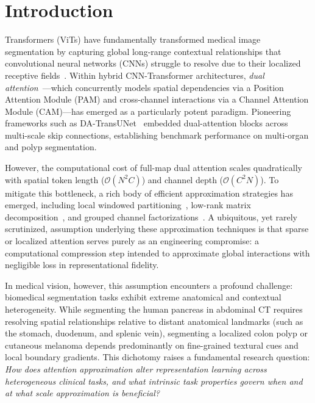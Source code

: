 \section{Introduction}
\label{sec:introduction}

 Transformers (ViTs) have fundamentally transformed medical image segmentation by capturing global long-range contextual relationships that convolutional neural networks (CNNs) struggle to resolve due to their localized receptive fields~\cite{chen2021transunet,cao2022swinunet,hatamizadeh2022unetr}. Within hybrid CNN-Transformer architectures, \emph{dual attention}~\cite{fu2019dual}---which concurrently models spatial dependencies via a Position Attention Module (PAM) and cross-channel interactions via a Channel Attention Module (CAM)---has emerged as a particularly potent paradigm. Pioneering frameworks such as DA-TransUNet~\cite{sun2024datransunet} embedded dual-attention blocks across multi-scale skip connections, establishing benchmark performance on multi-organ and polyp segmentation.

However, the computational cost of full-map dual attention scales quadratically with spatial token length ($\mathcal{O}(N^2C)$) and channel depth ($\mathcal{O}(C^2N)$). To mitigate this bottleneck, a rich body of efficient approximation strategies has emerged, including local windowed partitioning~\cite{liu2021swin}, low-rank matrix decomposition~\cite{wang2020linformer}, and grouped channel factorizations~\cite{rahman2024emcad}. A ubiquitous, yet rarely scrutinized, assumption underlying these approximation techniques is that sparse or localized attention serves purely as an engineering compromise: a computational compression step intended to approximate global interactions with negligible loss in representational fidelity.

In medical vision, however, this assumption encounters a profound challenge: biomedical segmentation tasks exhibit extreme anatomical and contextual heterogeneity. While segmenting the human pancreas in abdominal CT requires resolving spatial relationships relative to distant anatomical landmarks (such as the stomach, duodenum, and splenic vein), segmenting a localized colon polyp or cutaneous melanoma depends predominantly on fine-grained textural cues and local boundary gradients. This dichotomy raises a fundamental research question: \emph{How does attention approximation alter representation learning across heterogeneous clinical tasks, and what intrinsic task properties govern when and at what scale approximation is beneficial?}

